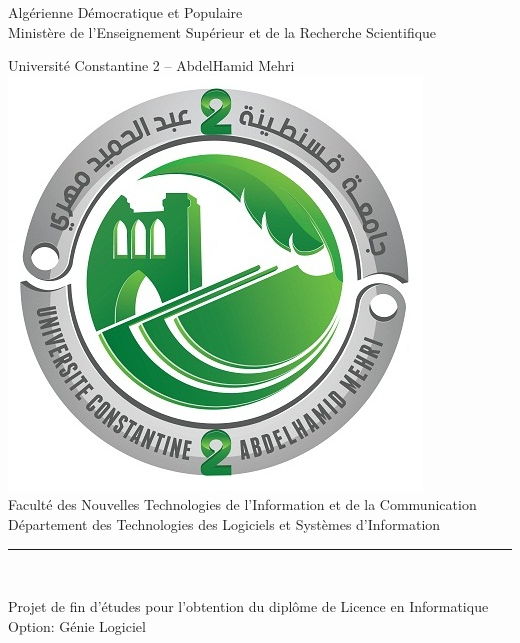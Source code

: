 \documentclass[12pt,french]{report}
\begin{document}
	\begin{titlepage}
		\begin{center}
			\large Algérienne Démocratique et Populaire\\
			
			\large Ministère de l’Enseignement Supérieur et de la Recherche Scientifique
			
			\large Université Constantine 2 – AbdelHamid Mehri\\
			
			\vspace{0.01\textheight}
			\includegraphics[width=0.2\textheight]{logo.jpg}\\
			
			Faculté des Nouvelles Technologies de l’Information et de la Communication\\
			Département des Technologies des Logiciels et Systèmes d’Information\\
			
			\vspace{0.025\textheight}
			\par\noindent\rule{10cm}{3pt}\\
			\vspace{0.05\textheight}
			
			\large{Projet de fin d’études pour l’obtention du diplôme de Licence en Informatique}\\
			
			\vspace{0.025\textheight}
			Option: Génie Logiciel\\
			

\end{center}
\end{titlepage}
\end{document}
